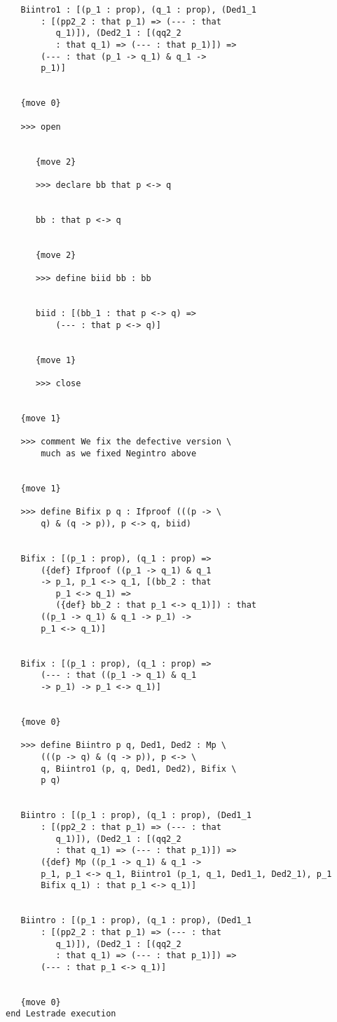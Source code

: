\documentclass[12pt]{article}
\begin{document}
\begin{verbatim}
   Biintro1 : [(p_1 : prop), (q_1 : prop), (Ded1_1 
       : [(pp2_2 : that p_1) => (--- : that 
          q_1)]), (Ded2_1 : [(qq2_2 
          : that q_1) => (--- : that p_1)]) => 
       (--- : that (p_1 -> q_1) & q_1 -> 
       p_1)]


   {move 0}

   >>> open


      {move 2}

      >>> declare bb that p <-> q


      bb : that p <-> q


      {move 2}

      >>> define biid bb : bb


      biid : [(bb_1 : that p <-> q) => 
          (--- : that p <-> q)]


      {move 1}

      >>> close


   {move 1}

   >>> comment We fix the defective version \
       much as we fixed Negintro above


   {move 1}

   >>> define Bifix p q : Ifproof (((p -> \
       q) & (q -> p)), p <-> q, biid)


   Bifix : [(p_1 : prop), (q_1 : prop) => 
       ({def} Ifproof ((p_1 -> q_1) & q_1 
       -> p_1, p_1 <-> q_1, [(bb_2 : that 
          p_1 <-> q_1) => 
          ({def} bb_2 : that p_1 <-> q_1)]) : that 
       ((p_1 -> q_1) & q_1 -> p_1) -> 
       p_1 <-> q_1)]


   Bifix : [(p_1 : prop), (q_1 : prop) => 
       (--- : that ((p_1 -> q_1) & q_1 
       -> p_1) -> p_1 <-> q_1)]


   {move 0}

   >>> define Biintro p q, Ded1, Ded2 : Mp \
       (((p -> q) & (q -> p)), p <-> \
       q, Biintro1 (p, q, Ded1, Ded2), Bifix \
       p q)


   Biintro : [(p_1 : prop), (q_1 : prop), (Ded1_1 
       : [(pp2_2 : that p_1) => (--- : that 
          q_1)]), (Ded2_1 : [(qq2_2 
          : that q_1) => (--- : that p_1)]) => 
       ({def} Mp ((p_1 -> q_1) & q_1 -> 
       p_1, p_1 <-> q_1, Biintro1 (p_1, q_1, Ded1_1, Ded2_1), p_1 
       Bifix q_1) : that p_1 <-> q_1)]


   Biintro : [(p_1 : prop), (q_1 : prop), (Ded1_1 
       : [(pp2_2 : that p_1) => (--- : that 
          q_1)]), (Ded2_1 : [(qq2_2 
          : that q_1) => (--- : that p_1)]) => 
       (--- : that p_1 <-> q_1)]


   {move 0}
end Lestrade execution
\end{verbatim}
\end{document}
